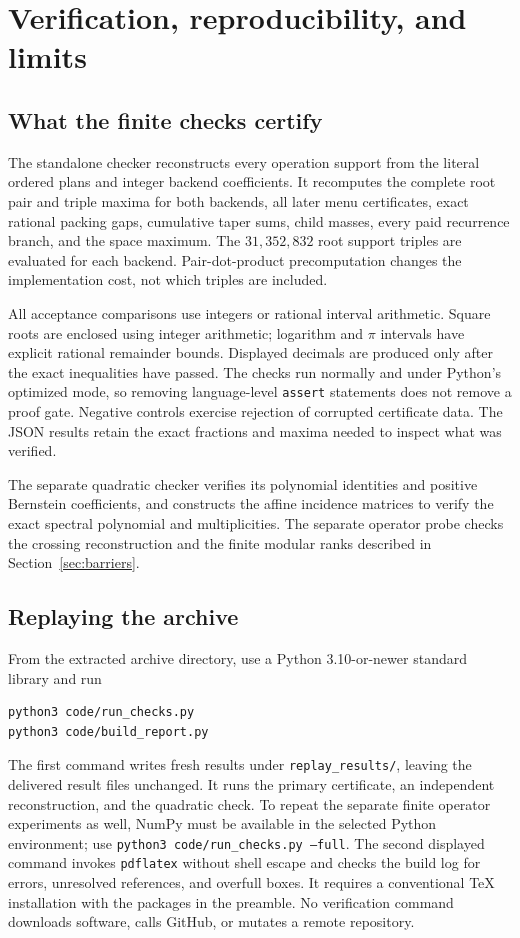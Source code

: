 \section{Verification, reproducibility, and limits}
\label{sec:validation}

\subsection{What the finite checks certify}

The standalone checker reconstructs every operation support from the
literal ordered plans and integer backend coefficients. It recomputes
the complete root pair and triple maxima for both backends, all later
menu certificates, exact rational packing gaps, cumulative taper sums,
child masses, every paid recurrence branch, and the space maximum.
The $31,352,832$ root support triples are evaluated for each backend.
Pair-dot-product precomputation changes the implementation cost, not
which triples are included.

All acceptance comparisons use integers or rational interval arithmetic.
Square roots are enclosed using integer arithmetic; logarithm and $\pi$
intervals have explicit rational remainder bounds. Displayed decimals
are produced only after the exact inequalities have passed. The checks
run normally and under Python's optimized mode, so removing language-level
\texttt{assert} statements does not remove a proof gate. Negative controls
exercise rejection of corrupted certificate data. The JSON results retain
the exact fractions and maxima needed to inspect what was verified.

The separate quadratic checker verifies its polynomial identities and
positive Bernstein coefficients, and constructs the affine incidence
matrices to verify the exact spectral polynomial and multiplicities.
The separate operator probe checks the crossing reconstruction and the
finite modular ranks described in Section~\ref{sec:barriers}.

\subsection{Replaying the archive}

From the extracted archive directory, use a Python 3.10-or-newer standard
library and run
\begin{verbatim}
python3 code/run_checks.py
python3 code/build_report.py
\end{verbatim}
The first command writes fresh results under \texttt{replay\_results/},
leaving the delivered result files unchanged. It runs the primary
certificate, an independent reconstruction, and the quadratic check.
To repeat the separate finite operator experiments as well, NumPy must
be available in the selected Python environment; use
\texttt{python3 code/run\_checks.py --full}.
The second displayed command invokes
\texttt{pdflatex} without shell escape and checks the build log for errors,
unresolved references, and overfull boxes. It requires a conventional TeX
installation with the packages in the preamble. No verification command
downloads software, calls GitHub, or mutates a remote repository.

